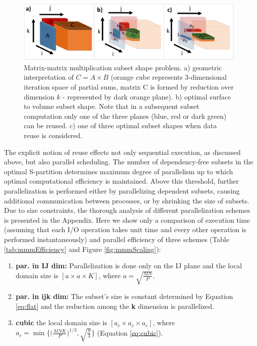 \documentclass[sigplan,review,anonymous]{acmart}\settopmatter{printfolios=true,printccs=false,printacmref=false}
\begin{document}
 \begin{figure}
 	\includegraphics[width=\columnwidth]{figures/mmm_reuse}
 	\caption{Matrix-matrix multiplication subset shape problem. a) 
 		geometric interpretation of $C = A \times B$ (orange cube represents 
 		3-dimensional iteration space of partial sums, matrix C is formed by 
 		reduction over dimension $k$ - represented by dark orange plane). b) 
 		optimal surface to volume subset shape. Note that in a subsequent 
 		subset computation only one of the three planes (blue, red or dark 
 		green) can be reused. c) one of three optimal subset shapes when 
 		data reuse is considered.}
 	\label{fig:mmmreuse}
 \end{figure}

The explicit notion of reuse effects not only sequential execution, as 
discussed above, but also parallel scheduling. The number of dependency-free 
subsets in the optimal S-partition determines maximum degree of parallelism up 
to which optimal computational efficiency is maintained. Above this threshold, 
further parallelization is performed either by parallelizing dependent subsets, 
causing additional communication between processes, or by shrinking the size of 
subsets.
 Due to size constraints, the thorough analysis of different parallelization 
 schemes is presented in the Appendix.  Here we show only a comparison of 
 execution time (assuming that each I/O operation takes unit time and every 
 other operation is performed instantaneously) and parallel efficiency of three 
 schemes (Table \ref{tab:mmmEfficiency} and Figure \ref{fig:mmmScaling}): 
\begin{enumerate}
	\item \textbf{par. in IJ dim:} 
	Parallelization is done only on the IJ plane and the local domain size is 
	$[a \times a \times K]$, where $a = \sqrt{\frac{MN}{P}}$.
	\item \textbf{par. in ijk dim:} The subset's size is 
	constant determined by 
	Equation \ref{eq:flat} and the reduction among the \textbf{k} dimension is 
	parallelized.
	\item \textbf{cubic} 
	the local domain size is 
	$[a_c \times a_c \times a_c]$, where $a_c = 
	\min\{\big(\frac{MNK}{P}\big)^{1/3}, 
	\sqrt{\frac{S}{3}}\}$ (Equation \ref{eq:cubic}).
\end{enumerate}
\end{document}
